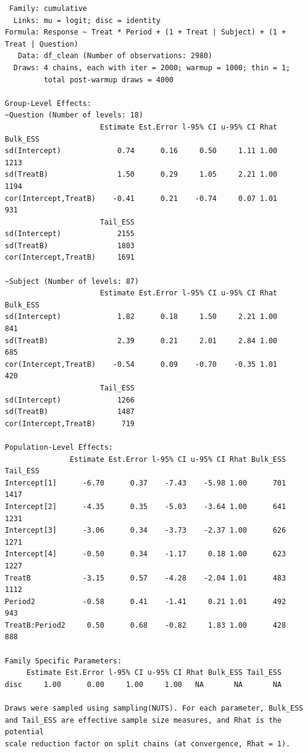 \documentclass[
  12pt,
  a4paper,
  extrafontsizes,
  onecolumn,
  openright]{memoir}
\begin{document}
\begin{verbatim}
 Family: cumulative 
  Links: mu = logit; disc = identity 
Formula: Response ~ Treat * Period + (1 + Treat | Subject) + (1 + Treat | Question) 
   Data: df_clean (Number of observations: 2980) 
  Draws: 4 chains, each with iter = 2000; warmup = 1000; thin = 1;
         total post-warmup draws = 4000

Group-Level Effects: 
~Question (Number of levels: 18) 
                      Estimate Est.Error l-95% CI u-95% CI Rhat Bulk_ESS
sd(Intercept)             0.74      0.16     0.50     1.11 1.00     1213
sd(TreatB)                1.50      0.29     1.05     2.21 1.00     1194
cor(Intercept,TreatB)    -0.41      0.21    -0.74     0.07 1.01      931
                      Tail_ESS
sd(Intercept)             2155
sd(TreatB)                1803
cor(Intercept,TreatB)     1691

~Subject (Number of levels: 87) 
                      Estimate Est.Error l-95% CI u-95% CI Rhat Bulk_ESS
sd(Intercept)             1.82      0.18     1.50     2.21 1.00      841
sd(TreatB)                2.39      0.21     2.01     2.84 1.00      685
cor(Intercept,TreatB)    -0.54      0.09    -0.70    -0.35 1.01      420
                      Tail_ESS
sd(Intercept)             1266
sd(TreatB)                1487
cor(Intercept,TreatB)      719

Population-Level Effects: 
               Estimate Est.Error l-95% CI u-95% CI Rhat Bulk_ESS Tail_ESS
Intercept[1]      -6.70      0.37    -7.43    -5.98 1.00      701     1417
Intercept[2]      -4.35      0.35    -5.03    -3.64 1.00      641     1231
Intercept[3]      -3.06      0.34    -3.73    -2.37 1.00      626     1271
Intercept[4]      -0.50      0.34    -1.17     0.18 1.00      623     1227
TreatB            -3.15      0.57    -4.28    -2.04 1.01      483     1112
Period2           -0.58      0.41    -1.41     0.21 1.01      492      943
TreatB:Period2     0.50      0.68    -0.82     1.83 1.00      428      888

Family Specific Parameters: 
     Estimate Est.Error l-95% CI u-95% CI Rhat Bulk_ESS Tail_ESS
disc     1.00      0.00     1.00     1.00   NA       NA       NA

Draws were sampled using sampling(NUTS). For each parameter, Bulk_ESS
and Tail_ESS are effective sample size measures, and Rhat is the potential
scale reduction factor on split chains (at convergence, Rhat = 1).
\end{verbatim}
\end{document}
